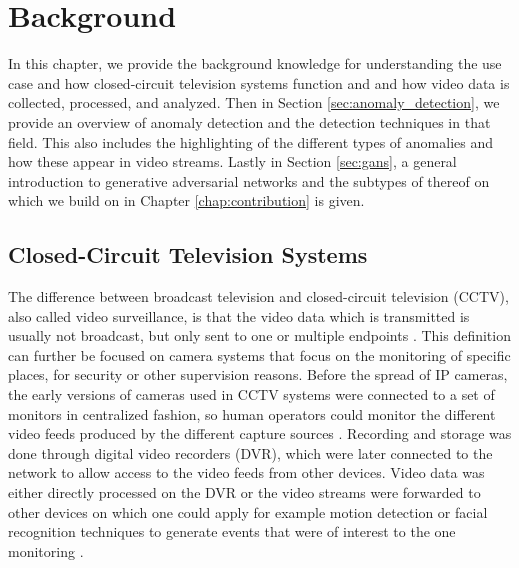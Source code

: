 \chapter{Background} \label{chap:background} %

In this chapter, we provide the background knowledge for understanding the use case and how closed-circuit television systems function and and how video data is collected, processed, and analyzed. Then in Section \ref{sec:anomaly_detection}, we provide an overview of anomaly detection and the detection techniques in that field. This also includes the highlighting of the different types of anomalies and how these appear in video streams. Lastly in Section \ref{sec:gans}, a general introduction to generative adversarial networks and the subtypes of thereof on which we build on in Chapter \ref{chap:contribution} is given.



\section{Closed-Circuit Television Systems} \label{sec:cctv}

The difference between broadcast television and closed-circuit television (CCTV), also called video surveillance, is that the video data which is transmitted is usually not broadcast, but only sent to one or multiple endpoints \cite{damjanovski2005cctv}. This definition can further be focused on camera systems that focus on the monitoring of specific places, for security or other supervision reasons. Before the spread of IP cameras, the early versions of cameras used in CCTV systems were connected to a set of monitors in centralized fashion, so human operators could monitor the different video feeds produced by the different capture sources \cite{dempsey2010introduction}. Recording and storage was done through digital video recorders (DVR), which were later connected to the network to allow access to the video feeds from other devices. Video data was either directly processed on the DVR or the video streams were forwarded to other devices on which one could apply for example motion detection or facial recognition techniques to generate events that were of interest to the one monitoring \cite{kruegle2011cctv, bruce2001matching}.

